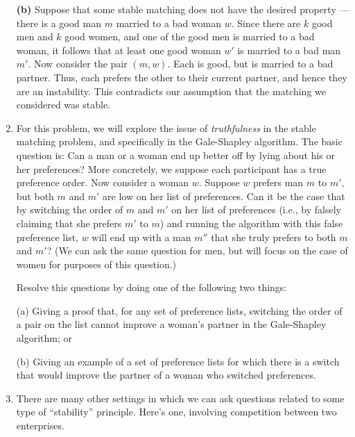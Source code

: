 \documentclass[12pt]{article}
\begin{document}
\begin{enumerate}
{{\bf (b)}
Suppose that some stable matching does not have
the desired property --- there is a good man $m$
married to a bad woman $w$.
Since there are $k$ good men and $k$ good women,
and one of the good men is married to a bad woman,
it follows that at least one good woman $w'$ is
married to a bad man $m'$.
Now consider the pair $(m,w)$.
Each is good, but is married to a bad partner.
Thus, each prefers the other to their current partner,
and hence they are an instability.
This contradicts our assumption that the
matching we considered was stable.

}



\item\Star
For this problem, we will explore the issue of {\em truthfulness} in the
stable matching problem, and specifically in the Gale-Shapley algorithm.
The basic question is: Can a man or a woman end up better off by lying about
his or her preferences?
More concretely, we suppose each participant has a true preference order.
Now consider a woman $w$. Suppose $w$ prefers man $m$ to
$m'$, but both $m$ and $m'$ are low on her list of preferences. Can it be
the case that by switching the order of $m$ and $m'$ on her list of
preferences (i.e., by falsely claiming that she prefers $m'$ to $m$) and
running the algorithm with this false preference list, $w$ will end up with
a man $m''$ that she truly prefers to both $m$ and $m'$? 
(We can ask the same question for men, but will focus on the
case of women for purposes of this question.)

Resolve this questions by doing one of the following two things:

(a) Giving a proof that, for any set of preference lists, switching the order
of a pair on the list cannot improve a woman's partner in the
Gale-Shapley algorithm; or 

(b) Giving an example of a set of preference lists for which there
is a switch that would improve the partner of a woman who
switched preferences.


\item 

There are many other settings
in which we can
ask questions related to some type of ``stability'' principle.
Here's one, involving competition between two enterprises.


\end{enumerate}
\end{document}
